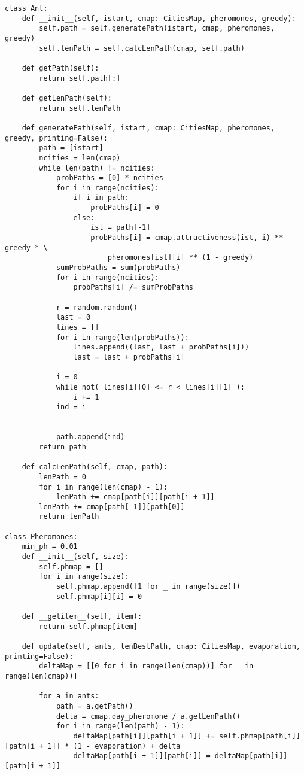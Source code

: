 \begin{center}
	\captionsetup{justification=raggedright,singlelinecheck=off}
	\renewcommand{\lstlistingname}{Листинг}
	\begin{lstlisting}[label=lst:lst2, caption=Реализация муравьиного алгоритма]
class Ant:
	def __init__(self, istart, cmap: CitiesMap, pheromones, greedy):
		self.path = self.generatePath(istart, cmap, pheromones, greedy)
		self.lenPath = self.calcLenPath(cmap, self.path)
	
	def getPath(self):
		return self.path[:]
	
	def getLenPath(self):
		return self.lenPath

	def generatePath(self, istart, cmap: CitiesMap, pheromones, greedy, printing=False):
		path = [istart]
		ncities = len(cmap)
		while len(path) != ncities:
			probPaths = [0] * ncities
			for i in range(ncities):
				if i in path:
					probPaths[i] = 0
				else:
					ist = path[-1]
					probPaths[i] = cmap.attractiveness(ist, i) ** greedy * \
						pheromones[ist][i] ** (1 - greedy)
			sumProbPaths = sum(probPaths)
			for i in range(ncities):
				probPaths[i] /= sumProbPaths
			
			r = random.random()
			last = 0
			lines = []
			for i in range(len(probPaths)):
				lines.append((last, last + probPaths[i]))
				last = last + probPaths[i]

			i = 0
			while not( lines[i][0] <= r < lines[i][1] ):
				i += 1
			ind = i


			path.append(ind)
		return path

	def calcLenPath(self, cmap, path):
		lenPath = 0
		for i in range(len(cmap) - 1):
			lenPath += cmap[path[i]][path[i + 1]]
		lenPath += cmap[path[-1]][path[0]]
		return lenPath

class Pheromones:
	min_ph = 0.01
	def __init__(self, size):
		self.phmap = []
		for i in range(size):
			self.phmap.append([1 for _ in range(size)])
			self.phmap[i][i] = 0
	
	def __getitem__(self, item):
		return self.phmap[item]

	def update(self, ants, lenBestPath, cmap: CitiesMap, evaporation, printing=False):
		deltaMap = [[0 for i in range(len(cmap))] for _ in range(len(cmap))]
		
		for a in ants:
			path = a.getPath()
			delta = cmap.day_pheromone / a.getLenPath()
			for i in range(len(path) - 1):
				deltaMap[path[i]][path[i + 1]] += self.phmap[path[i]][path[i + 1]] * (1 - evaporation) + delta
				deltaMap[path[i + 1]][path[i]] = deltaMap[path[i]][path[i + 1]]



\end{lstlisting}
\end{center}

